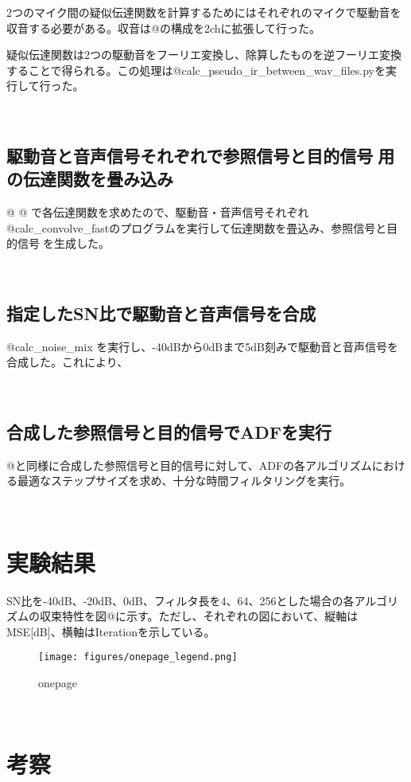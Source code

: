 2つのマイク間の疑似伝達関数を計算するためにはそれぞれのマイクで駆動音を収音する必要がある。収音は@の構成を2chに拡張して行った。

疑似伝達関数は2つの駆動音をフーリエ変換し、除算したものを逆フーリエ変換することで得られる。この処理は@calc\_pseudo\_ir\_between\_wav\_files.pyを実行して行った。

\
\subsection{駆動音と音声信号それぞれで参照信号と目的信号用の伝達関数を畳み込み}\label{convolve-each}

@ @
で各伝達関数を求めたので、駆動音・音声信号それぞれ@calc\_convolve\_fastのプログラムを実行して伝達関数を畳込み、参照信号と目的信号を生成した。

\
\subsection{指定したSN比で駆動音と音声信号を合成}\label{mix-snr}

@calc\_noise\_mix
を実行し、-40dBから0dBまで5dB刻みで駆動音と音声信号を合成した。これにより、

\
\subsection{合成した参照信号と目的信号でADFを実行}\label{exec-adf}

@と同様に合成した参照信号と目的信号に対して、ADFの各アルゴリズムにおける最適なステップサイズを求め、十分な時間フィルタリングを実行。

\
\section{実験結果}\label{result-practice}

SN比を-40dB、-20dB、0dB、フィルタ長を4、64、256とした場合の各アルゴリズムの収束特性を図@に示す。ただし、それぞれの図において、縦軸はMSE{[}dB{]}、横軸はIterationを示している。

\begin{figure}
\centering
\texttt{[image: figures/onepage\_legend.png]}
\caption{onepage}
\end{figure}

\
\section{考察}\label{consideration-practice}

